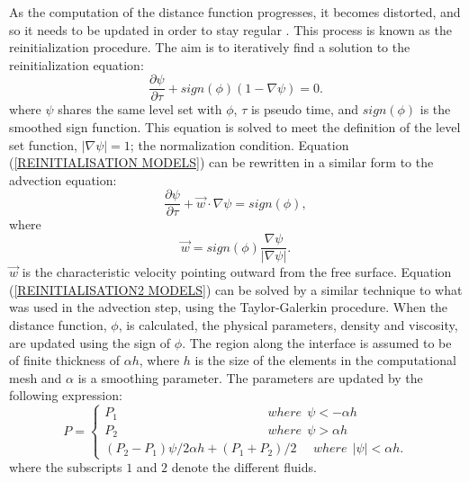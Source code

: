 As the computation of the distance function progresses, it becomes distorted, and so it needs to be updated in order to stay regular \cite{SUSSMAN1994}. This process is known as the reinitialization procedure. The aim is to iteratively find a solution to the reinitialization equation:
%
\begin{equation}
\frac{\partial \psi}{\partial \tau} + sign(\phi)(1 - \nabla \psi) = 0.
\label{REINITIALISATION MODELS}
\end{equation}
%
where $\psi$ shares the same level set with $\phi$, $\tau$ is pseudo time, and $sign(\phi)$ is the smoothed sign function. This equation is solved to meet the definition of the level set function, $\lvert \nabla \psi \rvert = 1$; the normalization condition. Equation (\ref{REINITIALISATION MODELS}) can be rewritten in a similar form to the advection equation:
%
\begin{equation}
\frac{\partial \psi}{\partial \tau} + \vec{w} \cdot \nabla \psi = sign(\phi),
\label{REINITIALISATION2 MODELS}
\end{equation}
%
where
%
\begin{equation}
\vec{w} = sign(\phi)\frac{\nabla \psi}{|\nabla \psi|}.
\label{REINITIALISATION3 MODELS}
\end{equation}
%
$\vec{w}$ is the characteristic velocity pointing outward from the free surface. Equation (\ref{REINITIALISATION2 MODELS}) can be solved by a similar technique to what was used in the advection step, using the Taylor-Galerkin procedure.
When the distance function, $\phi$, is calculated, the physical parameters, density and viscosity, are updated using the sign of $\phi$. The region along the interface is assumed to be of finite thickness of $\alpha h$, where $h$ is the size of the elements in the computational mesh and $\alpha$ is a smoothing parameter. The parameters are updated by the following expression:
%
\begin{equation}
P = 
\left \{ \begin{array}{l}
P_{1} \hspace{5cm}  where \ \ \psi < - \alpha h \\
P_{2} \hspace{5cm}  where \ \ \psi > \alpha h \\
(P_{2} - P_{1}) \psi/2\alpha h + (P_{1} + P_{2})/2 \ \ \ \ \ \ where \ \ |\psi| < \alpha h.
\end{array}
\right.
\label{UPDATE PARAMETERS MODELS}
\end{equation} 
%
where the subscripts $1$ and $2$ denote the different fluids.


